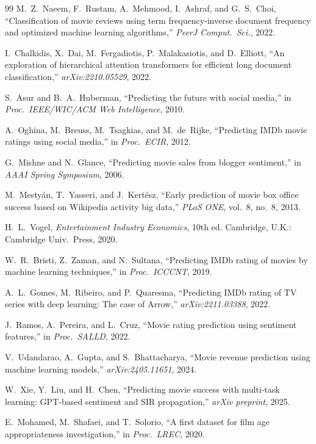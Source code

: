\documentclass[conference,a4paper]{IEEEtran}
\begin{document}
\begin{thebibliography}{99}
M.~Z.~Naeem, F.~Rustam, A.~Mehmood, I.~Ashraf, and G.~S.~Choi,
``Classification of movie reviews using term frequency-inverse document
frequency and optimized machine learning algorithms,'' \emph{PeerJ
Comput.\ Sci.}, 2022.

I.~Chalkidis, X.~Dai, M.~Fergadiotis, P.~Malakasiotis, and D.~Elliott,
``An exploration of hierarchical attention transformers for efficient
long document classification,'' \emph{arXiv:2210.05529}, 2022.

S.~Asur and B.~A.~Huberman, ``Predicting the future with social media,''
in \emph{Proc.\ IEEE/WIC/ACM Web Intelligence}, 2010.

A.~Oghina, M.~Breuss, M.~Tsagkias, and M.~de~Rijke, ``Predicting IMDb
movie ratings using social media,'' in \emph{Proc.\ ECIR}, 2012.

G.~Mishne and N.~Glance, ``Predicting movie sales from blogger
sentiment,'' in \emph{AAAI Spring Symposium}, 2006.

M.~Mesty{\'a}n, T.~Yasseri, and J.~Kert{\'e}sz, ``Early prediction of
movie box office success based on Wikipedia activity big data,''
\emph{PLoS ONE}, vol.~8, no.~8, 2013.

H.~L.~Vogel, \emph{Entertainment Industry Economics}, 10th ed.
Cambridge, U.K.: Cambridge Univ.\ Press, 2020.

W.~R.~Bristi, Z.~Zaman, and N.~Sultana, ``Predicting IMDb rating of
movies by machine learning techniques,'' in \emph{Proc.\ ICCCNT}, 2019.

A.~L.~Gomes, M.~Ribeiro, and P.~Quaresma, ``Predicting IMDb rating of TV
series with deep learning: The case of Arrow,''
\emph{arXiv:2211.03388}, 2022.

J.~Ramos, A.~Pereira, and L.~Cruz, ``Movie rating prediction using
sentiment features,'' in \emph{Proc.\ SALLD}, 2022.

V.~Udandarao, A.~Gupta, and S.~Bhattacharya, ``Movie revenue prediction
using machine learning models,'' \emph{arXiv:2405.11651}, 2024.

W.~Xie, Y.~Liu, and H.~Chen, ``Predicting movie success with multi-task
learning: GPT-based sentiment and SIR propagation,''
\emph{arXiv preprint}, 2025.

E.~Mohamed, M.~Shafaei, and T.~Solorio, ``A first dataset for film age
appropriateness investigation,'' in \emph{Proc.\ LREC}, 2020.


\end{thebibliography}
\end{document}
